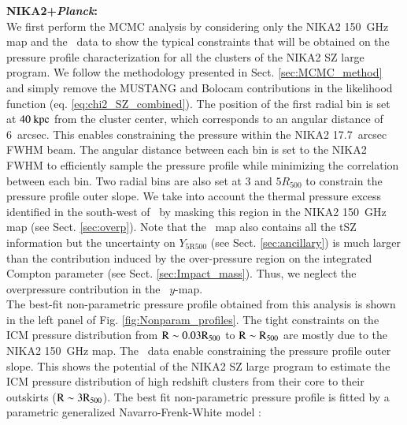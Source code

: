 \documentclass[traditabstract]{aa}
\begin{document}
\noindent\textbf{NIKA2+\textit{Planck}:}\\
We first perform the MCMC analysis by considering only the NIKA2 150~GHz map and the \planck\ data to show the typical constraints that will be obtained on the pressure profile characterization for all the clusters of the NIKA2 SZ large program. We follow the methodology presented in Sect. \ref{sec:MCMC_method} and simply remove the MUSTANG and Bolocam contributions in the likelihood function (eq. \ref{eq:chi2_SZ_combined}). The position of the first radial bin is set at $40~\rm{kpc}$ from the cluster center, which corresponds to an angular distance of 6~arcsec. This enables constraining the pressure within the NIKA2 17.7~arcsec FWHM beam. The angular distance between each bin is set to the NIKA2 FWHM to efficiently sample the pressure profile while minimizing the correlation between each bin. Two radial bins are also set at 3 and $5R_{500}$ to constrain the pressure profile outer slope. We take into account the thermal pressure excess identified in the south-west of \psz\ by masking this region in the NIKA2 150~GHz map (see Sect. \ref{sec:overp}). Note that the \planck\ map also contains all the tSZ information but the uncertainty on $Y_{\mathrm{5R500}}$ (see Sect. \ref{sec:ancillary}) is much larger than the contribution induced by the over-pressure region on the integrated Compton parameter (see Sect. \ref{sec:Impact_mass}). Thus, we neglect the overpressure contribution in the \planck\ $y$-map.\\
\indent The best-fit non-parametric pressure profile obtained from this analysis is shown in the left panel of Fig. \ref{fig:Nonparam_profiles}. The tight constraints on the ICM pressure distribution from $\rm{R} \sim 0.03 \rm{R_{500}}$ to $\rm{R} \sim \rm{R_{500}}$ are mostly due to the NIKA2 150~GHz map. The \planck\ data enable constraining the pressure profile outer slope. This shows the potential of the NIKA2 SZ large program to estimate the ICM pressure distribution of high redshift clusters from their core to their outskirts ($\rm{R} \sim 3\rm{R_{500}}$). The best fit non-parametric pressure profile is fitted by a parametric generalized Navarro-Frenk-White model \citep[gNFW, ][]{nag07}:
\end{document}
